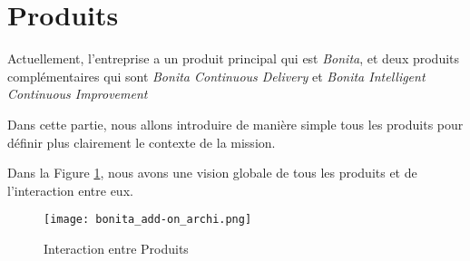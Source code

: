 \section{Produits} \label{produits}
Actuellement, l'entreprise a un produit principal qui est \emph{Bonita}, et deux produits complémentaires qui sont \textit{Bonita Continuous Delivery} et \textit{Bonita Intelligent Continuous Improvement}

Dans cette partie, nous allons introduire de manière simple tous les produits pour définir plus clairement le contexte de la mission.

Dans la Figure \ref{fig:bonita_add-on}, nous avons une vision globale de tous les produits et de l'interaction entre eux.

\begin{figure}[!ht]
\centering
\texttt{[image: bonita\_add-on\_archi.png]}
\caption{Interaction entre Produits}
\label{fig:bonita_add-on}
\end{figure}




